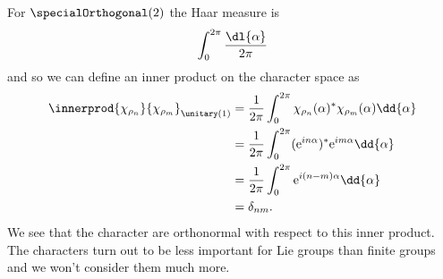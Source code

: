 For \(\specialOrthogonal(2)\) the Haar measure is
\begin{equation}
    \int_0^{2\pi} \frac{\dl{\alpha}}{2\pi}
\end{equation}
and so we can define an inner product on the character space as
\begin{align}
    \innerprod{\chi_{\rho_n}}{\chi_{\rho_m}}_{\unitary(1)} &= \frac{1}{2\pi}\int_{0}^{2\pi} \chi_{\rho_n}(\alpha)^* \chi_{\rho_m}(\alpha) \dd{\alpha}\\
    &= \frac{1}{2\pi} \int_{0}^{2\pi} (\e^{in\alpha})^*\e^{im\alpha} \dd{\alpha}\\
    &= \frac{1}{2\pi} \int_{0}^{2\pi} \e^{i(n - m)\alpha} \dd{\alpha}\\
    &= \delta_{nm}.
\end{align}
We see that the character are orthonormal with respect to this inner product.
The characters turn out to be less important for Lie groups than finite groups and we won't consider them much more.


